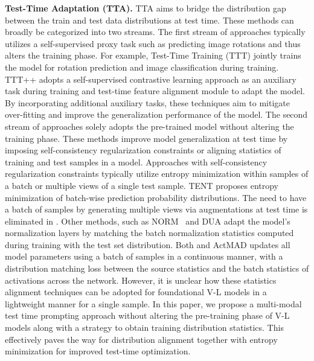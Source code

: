 \documentclass[a4paper]{article}
\begin{document}



\textbf{Test-Time Adaptation (TTA).} TTA \cite{sun2020test, wang2020tent, ttt_new} aims to bridge the distribution gap between the train and test data distributions at test time. These %
methods can broadly be categorized into two streams. The first stream of approaches \cite{gandelsman2022test, sun2020test} typically utilizes a self-supervised proxy task such as predicting image rotations and thus alters the training phase. For example, Test-Time Training (TTT) \cite{sun2020test} jointly trains the model for rotation prediction and image classification during training. TTT++ \cite{ttt_new} adopts a self-supervised contrastive learning approach as an auxiliary task during training and test-time feature alignment module to adapt the model. By incorporating additional auxiliary tasks, these techniques aim to mitigate over-fitting and improve the generalization performance of the model. The second stream of approaches solely adopts the pre-trained model without altering the training phase. These methods improve model generalization at test time by imposing self-consistency regularization constraints or aligning statistics of training and test samples in a model. Approaches with self-consistency regularization constraints typically utilize entropy minimization within samples of a batch or multiple views of a single test sample. TENT \cite{wang2020tent} proposes entropy minimization of batch-wise prediction probability distributions. The need to have a batch of samples by generating multiple views via augmentations at test time is eliminated in \cite{zhang2022memo}. Other methods, such as NORM~\cite{schneider2020improving} and DUA \cite{mirza2022norm} adapt the model's normalization layers by matching the batch normalization statistics computed during training with the test set distribution. 
Both \cite{lin2023video} and ActMAD \cite{mirza2022actmad} updates all model parameters using a batch of samples in a continuous manner, with a distribution matching loss between the source statistics and the batch statistics of activations across the network. However, it is unclear how these statistics alignment techniques can be adopted for foundational V-L models in a lightweight manner for a single sample. In this paper, we propose a multi-modal test time prompting approach without altering the pre-training phase of V-L models along with a strategy to obtain training distribution statistics. This effectively paves the way for distribution alignment together with entropy minimization for improved test-time optimization.  
 
\end{document}
